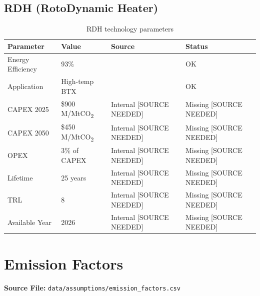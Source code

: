 \documentclass[12pt,a4paper]{article}
\newcommand{\sourceok}[1]{\textcolor{sourcegreen}{#1}}
\newcommand{\nosource}[1]{\textcolor{sourcered}{#1 [SOURCE NEEDED]}}
\newcommand{\COtwo}{CO\textsubscript{2}}
\begin{document}
\subsection{RDH (RotoDynamic Heater)}

\begin{table}[H]
\centering
\begin{tabular}{llll}
\toprule
\textbf{Parameter} & \textbf{Value} & \textbf{Source} & \textbf{Status} \\
\midrule
Energy Efficiency & 93\% & \citet{coolbrook2024} & \sourceok{OK} \\
Application & High-temp BTX & \citet{coolbrook2024} & \sourceok{OK} \\
CAPEX 2025 & \$900 M/Mt\COtwo & \nosource{Internal} & \nosource{Missing} \\
CAPEX 2050 & \$450 M/Mt\COtwo & \nosource{Internal} & \nosource{Missing} \\
OPEX & 3\% of CAPEX & \nosource{Internal} & \nosource{Missing} \\
Lifetime & 25 years & \nosource{Internal} & \nosource{Missing} \\
TRL & 8 & \nosource{Internal} & \nosource{Missing} \\
Available Year & 2026 & \nosource{Internal} & \nosource{Missing} \\
\bottomrule
\end{tabular}
\caption{RDH technology parameters}
\end{table}

\section{Emission Factors}
\label{sec:emission_factors}

\textbf{Source File:} \texttt{data/assumptions/emission\_factors.csv}
\end{document}

